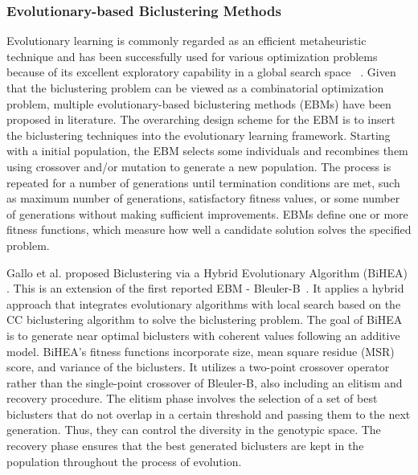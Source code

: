 
\subsubsection{Evolutionary-based Biclustering Methods }

Evolutionary learning is commonly regarded as an efficient metaheuristic technique and has been successfully used for various optimization problems because of its excellent exploratory capability in a global search space ~\cite{huang2012parallelized}.
Given that the biclustering problem can be viewed as a combinatorial optimization problem, multiple evolutionary-based biclustering methods (EBMs) have been proposed in literature.
The overarching design scheme for the EBM is to insert the biclustering techniques into the evolutionary learning framework.
Starting with a initial population, the EBM selects some individuals and recombines them using crossover and/or mutation to generate a new population.
The process is repeated for a number of generations until termination conditions are met, such as maximum number of generations, satisfactory fitness values, or some number of generations without making sufficient improvements.
EBMs define one or more fitness functions, which measure how well a candidate solution solves the specified problem.

Gallo et al. proposed Biclustering via a Hybrid Evolutionary Algorithm (BiHEA) \cite{gallo2009bihea}. This is an extension of the first reported EBM - Bleuler-B~\cite{bleuler2004ea}.
It applies a hybrid approach that integrates evolutionary algorithms with local search based on the CC biclustering algorithm \cite{cheng2000biclustering} to solve the biclustering problem.
The goal of BiHEA is to generate near optimal biclusters with coherent values following an additive model.
BiHEA's fitness functions incorporate size, mean square residue (MSR) score, and variance of the biclusters.
It utilizes a two-point crossover operator rather than the single-point crossover of Bleuler-B, also including an elitism and recovery procedure.
The elitism phase involves the selection of a set of best biclusters that do not overlap in a certain threshold and passing them to the next generation.
Thus, they can control the diversity in the genotypic space.
The recovery phase ensures that the best generated biclusters are kept in the population throughout the process of evolution.
 
